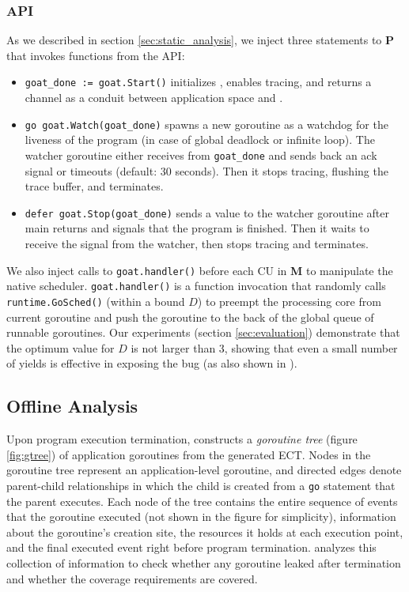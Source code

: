 \subsubsection{\goat API}
As we described in section \ref{sec:static_analysis}, we inject three statements to \textbf{P} that invokes functions from the \goat API:
\begin{itemize}
  \item \texttt{goat\_done := goat.Start()} initializes \goat, enables tracing, and returns a channel as a conduit between application space and \goat.
  \item \texttt{go goat.Watch(goat\_done)} spawns a new goroutine as a watchdog for the liveness of the program (in case of global deadlock or infinite loop). The watcher goroutine either receives from \texttt{goat\_done} and sends back an ack signal or timeouts (default: 30 seconds). Then it stops tracing, flushing the trace buffer, and terminates.
  \item \texttt{defer goat.Stop(goat\_done)} sends a value to the watcher goroutine after main returns and signals that the program is finished. Then it waits to receive the signal from the watcher, then stops tracing and terminates.
\end{itemize}

We also inject calls to \texttt{goat.handler()} before each CU in \textbf{M} to manipulate the native scheduler. \texttt{goat.handler()} is a function invocation that randomly calls \texttt{runtime.GoSched()} (within a bound $D$) to preempt the processing core from current goroutine and push the goroutine to the back of the global queue of runnable goroutines.
%
Our experiments (section \ref{sec:evaluation}) demonstrate that the optimum value for $D$ is not larger than 3, showing that even a small number of yields is effective in exposing the bug (as also shown in \cite{burckhardt-depthBug-asplos10}).

\subsection{Offline Analysis}
\label{sec:offline_analysis}
Upon program execution termination, \goat constructs a \textit{goroutine tree} (figure \ref{fig:gtree}) of application goroutines from the generated ECT.
%
Nodes in the goroutine tree represent an application-level goroutine, and directed edges denote parent-child relationships in which the child is created from a \texttt{go} statement that the parent executes.
%
Each node of the tree contains the entire sequence of events that the goroutine executed (not shown in the figure for simplicity), information about the goroutine's creation site, the resources it holds at each execution point, and the final executed event right before program termination.
%
\goat analyzes this collection of information to check whether any goroutine leaked after termination and whether the coverage requirements are covered.

